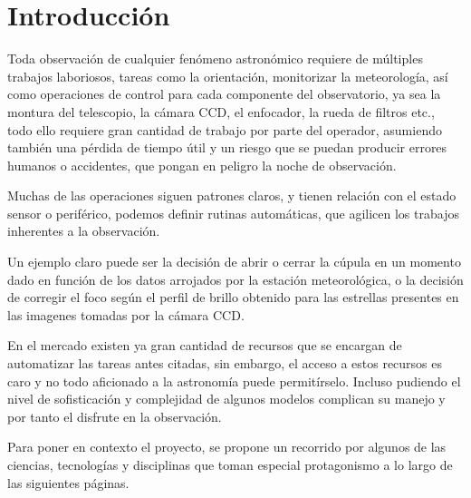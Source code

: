 \chapter{Introducción}

\bigskip
Toda observación de cualquier fenómeno astronómico requiere de múltiples trabajos laboriosos, tareas  como  la orientación, monitorizar la  meteorología, así como operaciones de control para cada componente del observatorio, ya sea la montura del telescopio, la cámara CCD, el enfocador, la rueda de filtros etc., todo ello requiere gran cantidad de trabajo por parte del operador, asumiendo también una pérdida de tiempo útil y un riesgo que se puedan producir errores humanos o accidentes, que pongan en peligro la noche de observación.

\bigskip
Muchas de las operaciones siguen patrones claros, y tienen relación con el estado sensor o periférico, podemos definir rutinas automáticas,
que agilicen los trabajos inherentes a la observación. 

\bigskip
Un ejemplo claro puede ser la decisión de abrir o cerrar la cúpula en un momento dado en función de los datos arrojados por la estación meteorológica, o la decisión de corregir el foco según el perfil de brillo obtenido para las estrellas presentes en las imagenes tomadas por la cámara CCD.

\bigskip
En el mercado existen ya gran cantidad de recursos que se encargan de automatizar las tareas antes citadas, sin embargo, el acceso a estos recursos es caro y no todo aficionado a la astronomía puede permitírselo. Incluso pudiendo el nivel de sofisticación y complejidad
de algunos modelos complican su manejo y por tanto el disfrute en la observación.


\newpage
\bigskip
Para poner en contexto el proyecto, se  propone un recorrido por algunos de las ciencias, tecnologías y disciplinas que toman especial  protagonismo a lo largo de las siguientes páginas.


